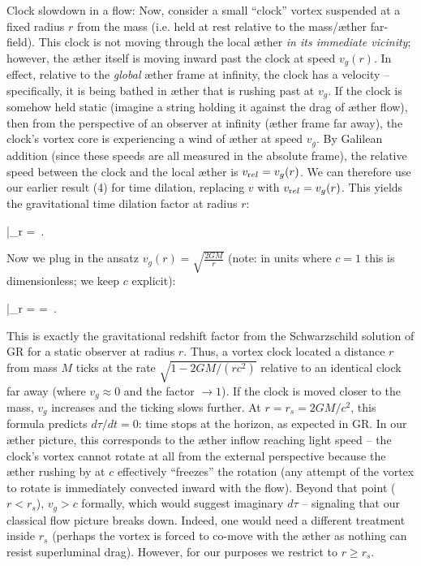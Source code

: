 \documentclass[aps,preprint,superscriptaddress]{revtex4}
\begin{document}
Clock slowdown in a flow: Now, consider a small “clock” vortex suspended at a fixed radius $r$ from the mass (i.e. held at rest relative to the mass/æther far-field). This clock is not moving through the local æther \textit{in its immediate vicinity}; however, the æther itself is moving inward past the clock at speed $v_g(r)$. In effect, relative to the \textit{global} æther frame at infinity, the clock has a velocity – specifically, it is being bathed in æther that is rushing past at $v_g$. If the clock is somehow held static (imagine a string holding it against the drag of æther flow), then from the perspective of an observer at infinity (æther frame far away), the clock’s vortex core is experiencing a wind of æther at speed $v_g$. By Galilean addition (since these speeds are all measured in the absolute frame), the relative speed between the clock and the local æther is $v_{\textrm rel}=v_g(r)$. We can therefore use our earlier result (4) for time dilation, replacing $v$ with $v_{\textrm rel}=v_g(r)$. This yields the gravitational time dilation factor at radius $r$:

\Big|_{r} \;=\; \,. 

Now we plug in the ansatz $v_g(r) = \sqrt{\frac{2GM}{r}}$ (note: in units where $c=1$ this is dimensionless; we keep $c$ explicit):

\Big|_{r} \;=\;  \;=\; \,. 

This is exactly the gravitational redshift factor from the Schwarzschild solution of GR for a static observer at radius $r$. Thus, a vortex clock located a distance $r$ from mass $M$ ticks at the rate $\sqrt{1-2GM/(rc^2)}$ relative to an identical clock far away (where $v_g\approx0$ and the factor $\to1$). If the clock is moved closer to the mass, $v_g$ increases and the ticking slows further. At $r=r_s=2GM/c^2$, this formula predicts $d\tau/dt=0$: time stops at the horizon, as expected in GR. In our æther picture, this corresponds to the æther inflow reaching light speed – the clock’s vortex cannot rotate at all from the external perspective because the æther rushing by at $c$ effectively “freezes” the rotation (any attempt of the vortex to rotate is immediately convected inward with the flow). Beyond that point ($r<r_s$), $v_g>c$ formally, which would suggest imaginary $d\tau$ – signaling that our classical flow picture breaks down. Indeed, one would need a different treatment inside $r_s$ (perhaps the vortex is forced to co-move with the æther as nothing can resist superluminal drag). However, for our purposes we restrict to $r \ge r_s$.
\end{document}
